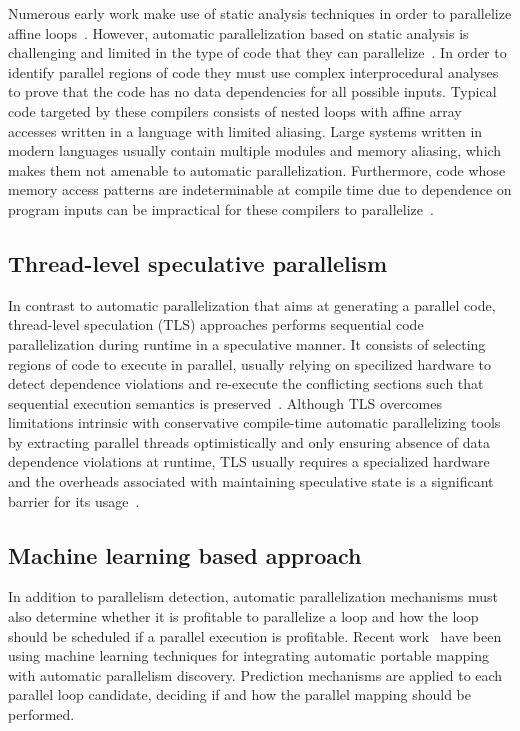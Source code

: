\documentclass[a4paper,12pt]{article}
\begin{document}
Numerous early work make use of static analysis techniques in order to
parallelize affine
loops~\cite{kuck81,padua93,blume94,lim97,bondhugula08,misailovic13}.  However,
automatic parallelization based on static analysis is challenging and limited
in the type of code that they can
parallelize~\cite{bruening98,kennedy01,chen03}.  In order to identify parallel
regions of code they must use complex interprocedural analyses to prove that
the code has no data dependencies for all possible inputs.  Typical code
targeted by these compilers consists of nested loops with affine array accesses
written in a language with limited aliasing. Large systems written in modern
languages usually contain multiple modules and memory aliasing, which makes
them not amenable to automatic parallelization.  Furthermore, code whose memory
access patterns are indeterminable at compile time due to dependence on program
inputs can be impractical for these compilers to parallelize~\cite{bruening98}.

\subsection{Thread-level speculative parallelism}

In contrast to automatic parallelization that aims at generating a parallel
code, thread-level speculation (TLS) approaches performs sequential code
parallelization during runtime in a speculative manner.  It consists of
selecting regions of code to execute in parallel, usually relying on specilized
hardware to detect dependence violations and re-execute the conflicting
sections such that sequential execution semantics is
preserved~\cite{hammond98,chen03,wu08}.  Although TLS overcomes limitations
intrinsic with conservative compile-time automatic parallelizing tools by
extracting parallel threads optimistically and only ensuring absence of data
dependence violations at runtime, TLS usually requires a specialized hardware
and the overheads associated with maintaining speculative state is a
significant barrier for its usage~\cite{yiapanis13}.

\subsection{Machine learning based approach}

In addition to parallelism detection, automatic parallelization mechanisms must
also determine whether it is profitable to parallelize a loop and how the loop
should be scheduled if a parallel execution is profitable.  Recent
work~\cite{wang09,tournavitis09,wang14a} have been using machine learning
techniques for integrating automatic portable mapping with automatic
parallelism discovery.  Prediction mechanisms are applied to each parallel loop
candidate, deciding if and how the parallel mapping should be performed.
\end{document}
